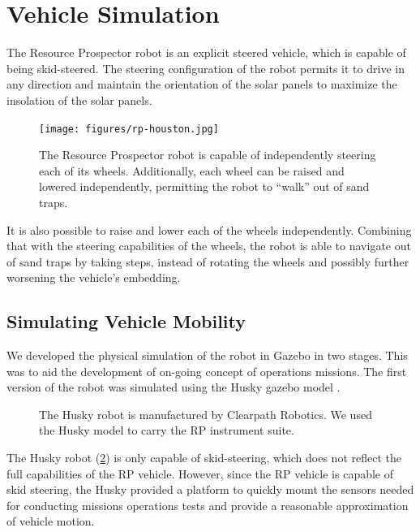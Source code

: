 \documentclass[twocolumn,letterpaper]{IEEEAerospaceCLS}  %
\begin{document}
\section{Vehicle Simulation}

The Resource Prospector robot is an explicit steered vehicle, which is capable of being skid-steered. 
The steering configuration of the robot permits it to drive in any direction and maintain the orientation of the solar panels to maximize the insolation of the solar panels.  

\begin{figure}[htp!]
\centering
\texttt{[image: figures/rp-houston.jpg]}
\caption{The Resource Prospector robot is capable of independently steering each of its wheels.  
Additionally, each wheel can be raised and lowered independently, permitting the robot to ``walk'' out of sand traps.  \label{fig:rp-houston}}
\end{figure}

It is also possible to raise and lower each of the wheels independently. 
Combining that with the steering capabilities of the wheels, the robot is able to navigate out of sand traps by taking steps, instead of rotating the wheels and possibly further worsening the vehicle's embedding.

\subsection{Simulating Vehicle Mobility}
\label{sec:simulated-rover}

We developed the physical simulation of the robot in Gazebo in two stages. 
This was to aid the development of on-going concept of operations missions.  
The first version of the robot was simulated using the Husky gazebo model \cite{gariepy2015husky}.  

\begin{figure}[htp]
\caption{The Husky robot is manufactured by Clearpath Robotics.  
We used the Husky model to carry the RP instrument suite. \label{fig:husky}}
\end{figure}

The Husky robot (\cref{fig:husky}) is only capable of skid-steering, which does not reflect the full capabilities of the RP vehicle.  
However, since the RP vehicle is capable of skid steering, the Husky provided a platform to quickly mount the sensors needed for conducting missions operations tests and provide a reasonable approximation of vehicle motion.  
\end{document}

